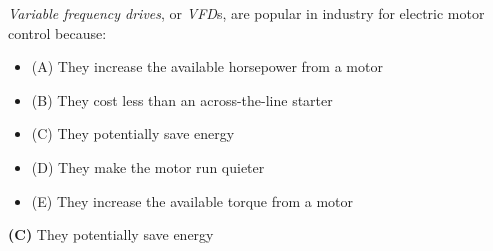 

{\it Variable frequency drives}, or {\it VFD}s, are popular in industry for electric motor control because:

\begin{itemize}
\item{(A)} They increase the available horsepower from a motor
\vskip 5pt 
\item{(B)} They cost less than an across-the-line starter
\vskip 5pt 
\item{(C)} They potentially save energy
\vskip 5pt 
\item{(D)} They make the motor run quieter
\vskip 5pt 
\item{(E)} They increase the available torque from a motor
\end{itemize}







{\bf (C)} They potentially save energy











